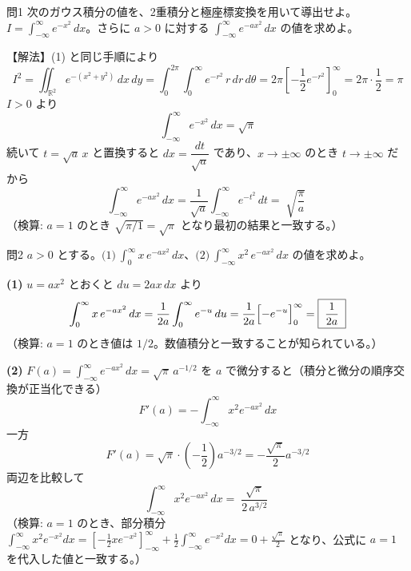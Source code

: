 \documentclass[a4paper,11pt]{article}
\begin{document}
\clearpage
\begin{mondaiboxS}{問1}
次のガウス積分の値を、2重積分と極座標変換を用いて導出せよ。$\displaystyle I = \int_{-\infty}^{\infty} e^{-x^{2}}\, dx$。さらに $a > 0$ に対する $\displaystyle\int_{-\infty}^{\infty} e^{-a x^{2}}\, dx$ の値を求めよ。
\end{mondaiboxS}
\kaitou
【解法】(1) と同じ手順により
\[
I^{2} = \iint_{\mathbb{R}^{2}} e^{-(x^{2}+y^{2})}\, dx\, dy
= \int_{0}^{2\pi}\!\! \int_{0}^{\infty} e^{-r^{2}}\, r\, dr\, d\theta
= 2\pi\left[-\frac{1}{2}e^{-r^{2}}\right]_{0}^{\infty}
= 2\pi \cdot \frac{1}{2} = \pi
\]
$I > 0$ より
\[
\boxed{\; \int_{-\infty}^{\infty} e^{-x^{2}}\, dx = \sqrt{\pi} \;}
\]
続いて $t = \sqrt{a}\, x$ と置換すると $dx = \dfrac{dt}{\sqrt{a}}$ であり、$x \to \pm\infty$ のとき $t \to \pm\infty$ だから
\[
\int_{-\infty}^{\infty} e^{-a x^{2}}\, dx = \frac{1}{\sqrt{a}} \int_{-\infty}^{\infty} e^{-t^{2}}\, dt = \boxed{\; \sqrt{\dfrac{\pi}{a}} \;}
\]
（検算: $a=1$ のとき $\sqrt{\pi/1} = \sqrt{\pi}$ となり最初の結果と一致する。）

\clearpage
\begin{mondaiboxS}{問2}
$a > 0$ とする。$\displaystyle\text{(1)}\ \int_{0}^{\infty} x\, e^{-a x^{2}}\, dx$、$\displaystyle\text{(2)}\ \int_{-\infty}^{\infty} x^{2}\, e^{-a x^{2}}\, dx$ の値を求めよ。
\end{mondaiboxS}
\kaitou
\textbf{(1)} $u = a x^{2}$ とおくと $du = 2ax\, dx$ より
\[
\int_{0}^{\infty} x\, e^{-a x^{2}}\, dx = \frac{1}{2a}\int_{0}^{\infty} e^{-u}\, du = \frac{1}{2a}\Bigl[-e^{-u}\Bigr]_{0}^{\infty} = \boxed{\; \frac{1}{2a} \;}
\]
（検算: $a=1$ のとき値は $1/2$。数値積分と一致することが知られている。）

\smallskip
\textbf{(2)} $\displaystyle F(a) = \int_{-\infty}^{\infty} e^{-a x^{2}}\, dx = \sqrt{\pi}\, a^{-1/2}$ を $a$ で微分すると（積分と微分の順序交換が正当化できる）
\[
F'(a) = -\int_{-\infty}^{\infty} x^{2} e^{-a x^{2}}\, dx
\]
一方
\[
F'(a) = \sqrt{\pi} \cdot \left(-\frac{1}{2}\right) a^{-3/2} = -\frac{\sqrt{\pi}}{2}a^{-3/2}
\]
両辺を比較して
\[
\int_{-\infty}^{\infty} x^{2} e^{-a x^{2}}\, dx = \boxed{\; \frac{\sqrt{\pi}}{2\, a^{3/2}} \;}
\]
（検算: $a=1$ のとき、部分積分 $\displaystyle\int_{-\infty}^{\infty} x^{2}e^{-x^{2}}dx = \left[-\frac{1}{2}x e^{-x^{2}}\right]_{-\infty}^{\infty} + \frac{1}{2}\int_{-\infty}^{\infty} e^{-x^{2}}dx = 0 + \frac{\sqrt{\pi}}{2}$ となり、公式に $a=1$ を代入した値と一致する。）
\end{document}
